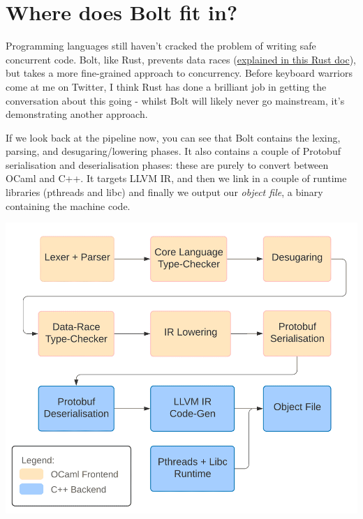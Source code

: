 \hypertarget{where-does-bolt-fit-in}{%
\section{\texorpdfstring{\protect\hyperlink{where-does-bolt-fit-in}{}Where
does Bolt fit
in?}{Where does Bolt fit in?}}\label{where-does-bolt-fit-in}}

Programming languages still haven't cracked the problem of writing safe
concurrent code. Bolt, like Rust, prevents data races
(\href{https://doc.rust-lang.org/nightly/nomicon/races.html}{explained
in this Rust doc}), but takes a more fine-grained approach to
concurrency. Before keyboard warriors come at me on Twitter, I think
Rust has done a brilliant job in getting the conversation about this
going - whilst Bolt will likely never go mainstream, it's demonstrating
another approach.

If we look back at the pipeline now, you can see that Bolt contains the
lexing, parsing, and desugaring/lowering phases. It also contains a
couple of Protobuf serialisation and deserialisation phases: these are
purely to convert between OCaml and C++. It targets LLVM IR, and then we
link in a couple of runtime libraries (pthreads and libc) and finally we
output our \emph{object file}, a binary containing the machine code.

{
\href{https://mukulrathi.com/static/67552b3afe850eb6515a639276f98f47/7792f/compiler-pipeline.png}{{}
\includegraphics[width=\linewidth]{How I wrote my own proper programming language_files/compiler-pipeline.png}}
}

